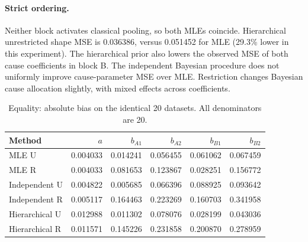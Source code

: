 \paragraph{Strict ordering.} Neither block activates classical pooling, so both MLEs coincide. Hierarchical unrestricted shape MSE is 0.036386, versus 0.051452 for MLE (29.3\% lower in this experiment). The hierarchical prior also lowers the observed MSE of both cause coefficients in block B. The independent Bayesian procedure does not uniformly improve cause-parameter MSE over MLE. Restriction changes Bayesian cause allocation slightly, with mixed effects across coefficients.

\begin{table}[htbp]\centering\small

\caption{Equality: absolute bias on the identical 20 datasets. All denominators are 20.}

\begin{tabular}{lrrrrr}\hline Method & $a$ & $b_{A1}$ & $b_{A2}$ & $b_{B1}$ & $b_{B2}$\\\hline

MLE U & 0.004033 & 0.014241 & 0.056455 & 0.061062 & 0.067459\\

MLE R & 0.004033 & 0.081653 & 0.123867 & 0.028251 & 0.156772\\

Independent U & 0.004822 & 0.005685 & 0.066396 & 0.088925 & 0.093642\\

Independent R & 0.005117 & 0.164463 & 0.223269 & 0.160703 & 0.341958\\

Hierarchical U & 0.012988 & 0.011302 & 0.078076 & 0.028199 & 0.043036\\

Hierarchical R & 0.011571 & 0.145226 & 0.231858 & 0.200870 & 0.278959\\

\hline\end{tabular}\end{table}

